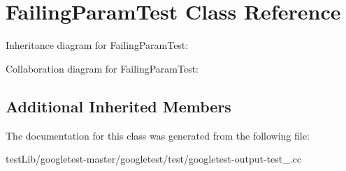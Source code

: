 \hypertarget{classFailingParamTest}{}\section{Failing\+Param\+Test Class Reference}
\label{classFailingParamTest}


Inheritance diagram for Failing\+Param\+Test\+:


Collaboration diagram for Failing\+Param\+Test\+:
\subsection*{Additional Inherited Members}


The documentation for this class was generated from the following file\+:\begin{DoxyCompactItemize}
\item 
test\+Lib/googletest-\/master/googletest/test/googletest-\/output-\/test\+\_\+.\+cc\end{DoxyCompactItemize}
